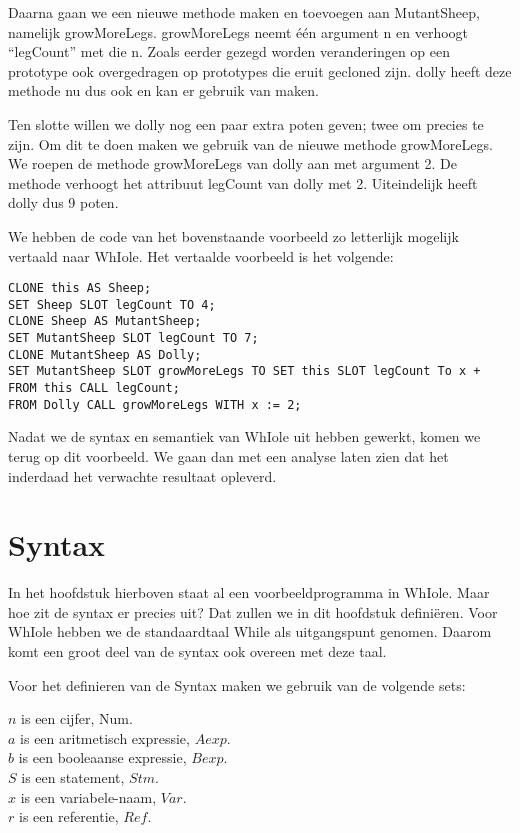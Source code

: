 \documentclass[12pt]{article}
\begin{document}
Daarna gaan we een nieuwe methode maken en toevoegen aan MutantSheep, namelijk growMoreLegs.
growMoreLegs neemt \'e\'en argument n en verhoogt ``legCount'' met die n. 
Zoals eerder gezegd worden veranderingen op een prototype ook overgedragen op prototypes die eruit gecloned zijn. dolly heeft deze methode nu dus ook en kan er gebruik van maken.\newline

Ten slotte willen we dolly nog een paar extra poten geven; twee om precies te zijn.
Om dit te doen maken we gebruik van de nieuwe methode growMoreLegs.
We roepen de methode growMoreLegs van dolly aan met argument 2.
De methode verhoogt het attribuut legCount van dolly met 2.
Uiteindelijk heeft dolly dus 9 poten.

We hebben de code van het bovenstaande voorbeeld zo letterlijk mogelijk vertaald naar WhIole.
Het vertaalde voorbeeld is het volgende:
\begin{lstlisting}[frame=single]
CLONE this AS Sheep;
SET Sheep SLOT legCount TO 4;
CLONE Sheep AS MutantSheep;
SET MutantSheep SLOT legCount TO 7;
CLONE MutantSheep AS Dolly;
SET MutantSheep SLOT growMoreLegs TO SET this SLOT legCount To x + FROM this CALL legCount;
FROM Dolly CALL growMoreLegs WITH x := 2;
\end{lstlisting}
Nadat we de syntax en semantiek van WhIole uit hebben gewerkt, komen we terug op dit voorbeeld.
We gaan dan met een analyse laten zien dat het inderdaad het verwachte resultaat opleverd.

\pagebreak
\section{Syntax}
In het hoofdstuk hierboven staat al een voorbeeldprogramma in WhIole. Maar hoe zit de syntax er precies uit? Dat zullen we in dit hoofdstuk definiëren. Voor WhIole hebben we de standaardtaal While als uitgangspunt genomen. Daarom komt een groot deel van de syntax ook overeen met deze taal.

Voor het definieren van de Syntax maken we gebruik van de volgende sets:

$n$ is een cijfer, Num. \\
$a$ is een aritmetisch expressie, $Aexp$. \\
$b$ is een booleaanse expressie, $Bexp$. \\
$S$ is een statement, $Stm$. \\
$x$ is een variabele-naam, $Var$. \\
$r$ is een referentie, $Ref$. \\
\end{document}
